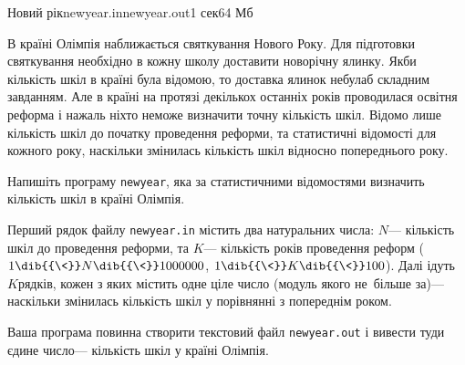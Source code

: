 \begin{problem}{Новий рік}{newyear.in}{newyear.out}{1 сек}{64 Мб}

В країні Олімпія наближається святкування Нового Року. Для підготовки святкування
необхідно в кожну школу доставити новорічну ялинку. Якби кількість шкіл в країні була
відомою, то доставка ялинок не\nolinebreak[3] була\nolinebreak[3] б складним завданням. Але в країні на протязі
декількох останніх років проводилася освітня реформа і нажаль ніхто не\nolinebreak[3] може визначити
точну кількість шкіл. Відомо лише кількість шкіл до початку проведення реформи, та
статистичні відомості для кожного року, на\nolinebreak[3] скільки змінилась кількість шкіл відносно
попереднього року.

\Task 
Напишіть програму \texttt{newyear}, яка за статистичними відомостями визначить
кількість шкіл в країні Олімпія.

\InputFile
Перший рядок файлу \texttt{newyear.in} містить два натуральних числа: $N$\nolinebreak[3] ---
кількість шкіл до проведення реформи, та $K$\nolinebreak[3] --- кількість років проведення реформ ($1\dib{{\<}}N\dib{{\<}}1000000$, $1\dib{{\<}}K\dib{{\<}}100$). Далі ідуть $K$\nolinebreak[2] рядків, кожен з яких містить одне ціле число
(модуль якого не~більше за)\nolinebreak[3] --- на\nolinebreak[3] скільки змінилась кількість шкіл у порівнянні з
попереднім роком.

\OutputFile
Ваша програма повинна створити текстовий файл \texttt{newyear.out} і вивести туди
єдине число\nolinebreak[3] --- кількість шкіл у країні Олімпія.

\Example
%
\begin{exampleWidthsAndDefaultFileNames}{3em}{3em}%
%
\end{exampleWidthsAndDefaultFileNames}

\end{problem}
